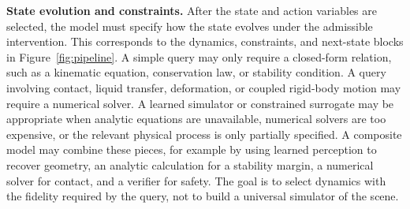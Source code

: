 \documentclass{article}
\begin{document}



\textbf{State evolution and constraints.} After the state and action variables are selected, the model must specify how the state evolves under the admissible intervention. This corresponds to the dynamics, constraints, and next-state blocks in Figure~\ref{fig:pipeline}. 
A simple query may only require a closed-form relation, such as a kinematic equation, conservation law, or stability condition. A query involving contact, liquid transfer, deformation, or coupled rigid-body motion may require a numerical solver. A learned simulator or constrained surrogate may be appropriate when analytic equations are unavailable, numerical solvers are too expensive, or the relevant physical process is only partially specified. A composite model may combine these pieces, for example by using learned perception to recover geometry, an analytic calculation for a stability margin, a numerical solver for contact, and a verifier for safety.
The goal is to select dynamics with the fidelity required by the query, not to build a universal simulator of the scene. 
\end{document}
